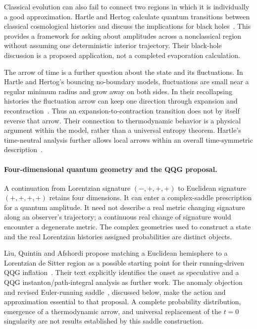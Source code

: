 Classical evolution can also fail to connect two regions in which it is individually a good approximation.  Hartle and Hertog calculate quantum transitions between classical cosmological histories and discuss the implications for black holes~\cite{HartleHertog:2015}.  This provides a framework for asking about amplitudes across a nonclassical region without assuming one deterministic interior trajectory.  Their black-hole discussion is a proposed application, not a completed evaporation calculation.

The arrow of time is a further question about the state and its fluctuations.  In Hartle and Hertog's bouncing no-boundary models, fluctuations are small near a regular minimum radius and grow away on both sides.  In their recollapsing histories the fluctuation arrow can keep one direction through expansion and recontraction~\cite{HartleHertog:2012}.  Thus an expansion-to-contraction transition does not by itself reverse that arrow.  Their connection to thermodynamic behavior is a physical argument within the model, rather than a universal entropy theorem.  Hartle's time-neutral analysis further allows local arrows within an overall time-symmetric description~\cite{Hartle:2013Arrow}.

\paragraph*{Four-dimensional quantum geometry and the QQG proposal.}
A continuation from Lorentzian signature $(-,+,+,+)$ to Euclidean signature $(+,+,+,+)$ retains four dimensions.  It can enter a complex-saddle prescription for a quantum amplitude.  It need not describe a real metric changing signature along an observer's trajectory; a continuous real change of signature would encounter a degenerate metric.  The complex geometries used to construct a state and the real Lorentzian histories assigned probabilities are distinct objects.

Liu, Quintin and Afshordi propose matching a Euclidean hemisphere to a Lorentzian de Sitter region as a possible starting point for their running-driven QQG inflation~\cite{Liu:2026}.  Their text explicitly identifies the onset as speculative and a QQG instanton/path-integral analysis as further work.  The anomaly objection and revised Euler-running saddle~\cite{Shinn:2026,LiuAfshordi:2026}, discussed below, make the action and approximation essential to that proposal.  A complete probability distribution, emergence of a thermodynamic arrow, and universal replacement of the $t=0$ singularity are not results established by this saddle construction.

